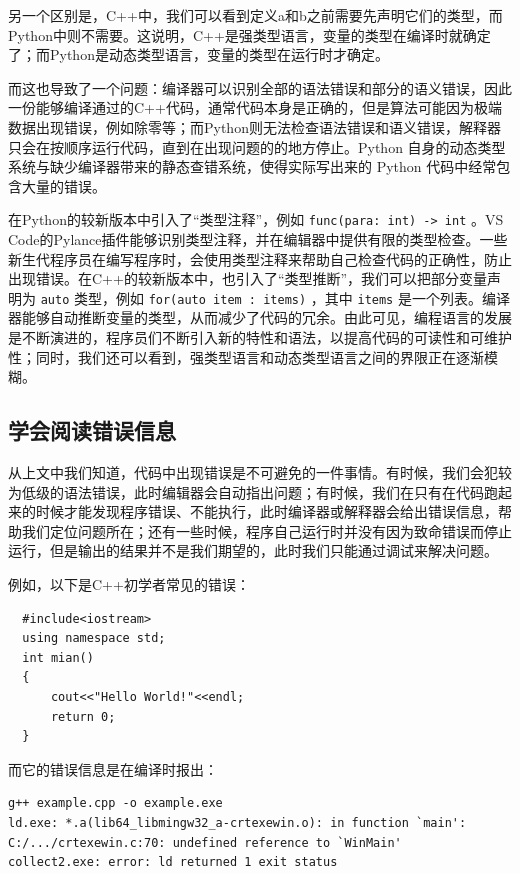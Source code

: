 另一个区别是，C++中，我们可以看到定义a和b之前需要先声明它们的类型，而Python中则不需要。这说明，C++是强类型语言，变量的类型在编译时就确定了；而Python是动态类型语言，变量的类型在运行时才确定。

而这也导致了一个问题：编译器可以识别全部的语法错误和部分的语义错误，因此一份能够编译通过的C++代码，通常代码本身是正确的，但是算法可能因为极端数据出现错误，例如除零等；而Python则无法检查语法错误和语义错误，解释器只会在按顺序运行代码，直到在出现问题的的地方停止。Python 自身的动态类型系统与缺少编译器带来的静态查错系统，使得实际写出来的 Python 代码中经常包含大量的错误。

\begin{note}
  在Python的较新版本中引入了“类型注释”，例如 \texttt{func(para: int) -> int} 。VS Code的Pylance插件能够识别类型注释，并在编辑器中提供有限的类型检查。一些新生代程序员在编写程序时，会使用类型注释来帮助自己检查代码的正确性，防止出现错误。在C++的较新版本中，也引入了“类型推断”，我们可以把部分变量声明为 \texttt{auto} 类型，例如 \texttt{for(auto item : items)} ，其中 \texttt{items} 是一个列表。编译器能够自动推断变量的类型，从而减少了代码的冗余。由此可见，编程语言的发展是不断演进的，程序员们不断引入新的特性和语法，以提高代码的可读性和可维护性；同时，我们还可以看到，强类型语言和动态类型语言之间的界限正在逐渐模糊。
\end{note}

\subsection{学会阅读错误信息}

从上文中我们知道，代码中出现错误是不可避免的一件事情。有时候，我们会犯较为低级的语法错误，此时编辑器会自动指出问题；有时候，我们在只有在代码跑起来的时候才能发现程序错误、不能执行，此时编译器或解释器会给出错误信息，帮助我们定位问题所在；还有一些时候，程序自己运行时并没有因为致命错误而停止运行，但是输出的结果并不是我们期望的，此时我们只能通过调试来解决问题。

例如，以下是C++初学者常见的错误：

\begin{verbatim}
  #include<iostream>
  using namespace std;
  int mian()
  {
      cout<<"Hello World!"<<endl;
      return 0;
  }
\end{verbatim}

而它的错误信息是在编译时报出：

\begin{verbatim}
g++ example.cpp -o example.exe
ld.exe: *.a(lib64_libmingw32_a-crtexewin.o): in function `main':
C:/.../crtexewin.c:70: undefined reference to `WinMain'
collect2.exe: error: ld returned 1 exit status
\end{verbatim}

